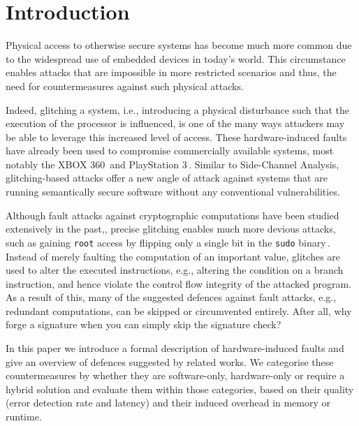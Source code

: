 %
%

\chapter{Introduction}
Physical access to otherwise secure systems has become much more common due to the widespread use of embedded devices in today's world. This circumstance enables attacks that are impossible in more restricted scenarios and thus, the need for countermeasures against such physical attacks. 

Indeed, glitching a system, i.e., introducing a physical disturbance such that the execution of the processor is influenced, is one of the many ways attackers may be able to leverage this increased level of access. These hardware-induced faults have already been used to compromise commercially available systems, most notably the XBOX 360\,\cite{free60} and PlayStation 3\,\cite{ps3hyper}. Similar to Side-Channel Analysis, glitching-based attacks offer a new angle of attack against systems that are running semantically secure software without any conventional vulnerabilities.

Although fault attacks against cryptographic computations have been studied extensively in the past,\cite{boneh1997importance}, precise glitching enables much more devious attacks, such as gaining \texttt{root} access by flipping only a single bit in the \texttt{sudo} binary\,\cite{gruss2018another}. Instead of merely faulting the computation of an important value, glitches are used to alter the executed instructions, e.g., altering the condition on a branch instruction, and hence violate the control flow integrity of the attacked program.  As a result of this, many of the suggested defences against fault attacks, e.g., redundant computations, can be skipped or circumvented entirely. After all, why forge a signature when you can simply skip the signature check?

In this paper we introduce a formal description of hardware-induced faults and give an overview of  defences suggested by related works. We categorise these countermeasures by whether they are software-only, hardware-only or require a hybrid solution and evaluate them within those categories, based on their quality (error detection rate and latency) and their induced overhead in memory or runtime.

